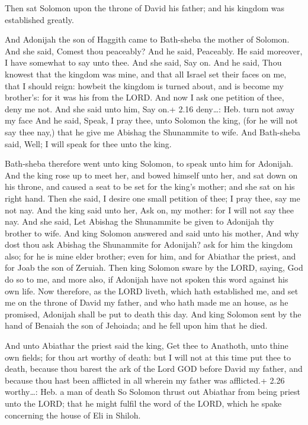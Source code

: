  Then sat Solomon upon the throne of David his father;
and his kingdom was established greatly.

 And Adonijah the son of Haggith came to Bath-sheba the
mother of Solomon. And she said, Comest thou peaceably? And he said,
Peaceably.  He said moreover, I have somewhat to say unto
thee. And she said, Say on.  And he said, Thou knowest that
the kingdom was mine, and that all Israel set their faces on me, that I
should reign: howbeit the kingdom is turned about, and is become my
brother's: for it was his from the LORD.  And now I ask one
petition of thee, deny me not. And she said unto him, Say on.+ 2.16
deny\ldots: Heb. turn not away my face  And he said, Speak,
I pray thee, unto Solomon the king, (for he will not say thee nay,) that
he give me Abishag the Shunammite to wife.  And Bath-sheba
said, Well; I will speak for thee unto the king.

 Bath-sheba therefore went unto king Solomon, to speak
unto him for Adonijah. And the king rose up to meet her, and bowed
himself unto her, and sat down on his throne, and caused a seat to be
set for the king's mother; and she sat on his right hand. 
Then she said, I desire one small petition of thee; I pray thee, say me
not nay. And the king said unto her, Ask on, my mother: for I will not
say thee nay.  And she said, Let Abishag the Shunammite be
given to Adonijah thy brother to wife.  And king Solomon
answered and said unto his mother, And why dost thou ask Abishag the
Shunammite for Adonijah? ask for him the kingdom also; for he is mine
elder brother; even for him, and for Abiathar the priest, and for Joab
the son of Zeruiah.  Then king Solomon sware by the LORD,
saying, God do so to me, and more also, if Adonijah have not spoken this
word against his own life.  Now therefore, as the LORD
liveth, which hath established me, and set me on the throne of David my
father, and who hath made me an house, as he promised, Adonijah shall be
put to death this day.  And king Solomon sent by the hand
of Benaiah the son of Jehoiada; and he fell upon him that he died.

 And unto Abiathar the priest said the king, Get thee to
Anathoth, unto thine own fields; for thou art worthy of death: but I
will not at this time put thee to death, because thou barest the ark of
the Lord GOD before David my father, and because thou hast been
afflicted in all wherein my father was afflicted.+ 2.26 worthy\ldots:
Heb. a man of death  So Solomon thrust out Abiathar from
being priest unto the LORD; that he might fulfil the word of the LORD,
which he spake concerning the house of Eli in Shiloh.

